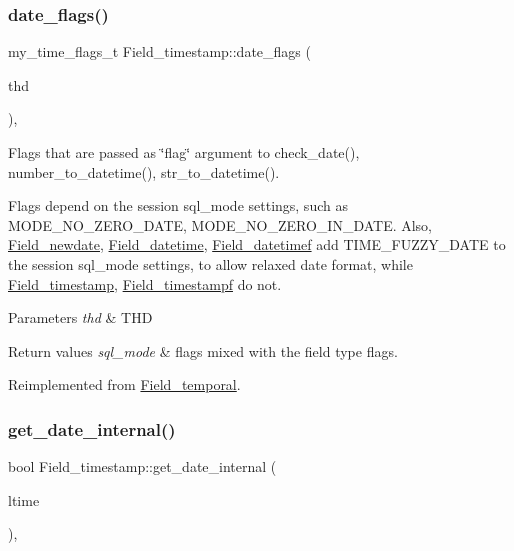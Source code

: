 \subsubsection{\texorpdfstring{date\+\_\+flags()}{date\_flags()}}
{\footnotesize\ttfamily my\+\_\+time\+\_\+flags\+\_\+t Field\+\_\+timestamp\+::date\+\_\+flags (\begin{DoxyParamCaption}\item[{const T\+HD $\ast$}]{thd }\end{DoxyParamCaption})\hspace{0.3cm}{\ttfamily [protected]}, {\ttfamily [virtual]}}

Flags that are passed as \char`\"{}flag\char`\"{} argument to check\+\_\+date(), number\+\_\+to\+\_\+datetime(), str\+\_\+to\+\_\+datetime().

Flags depend on the session sql\+\_\+mode settings, such as M\+O\+D\+E\+\_\+\+N\+O\+\_\+\+Z\+E\+R\+O\+\_\+\+D\+A\+TE, M\+O\+D\+E\+\_\+\+N\+O\+\_\+\+Z\+E\+R\+O\+\_\+\+I\+N\+\_\+\+D\+A\+TE. Also, \mbox{\hyperlink{classField__newdate}{Field\+\_\+newdate}}, \mbox{\hyperlink{classField__datetime}{Field\+\_\+datetime}}, \mbox{\hyperlink{classField__datetimef}{Field\+\_\+datetimef}} add T\+I\+M\+E\+\_\+\+F\+U\+Z\+Z\+Y\+\_\+\+D\+A\+TE to the session sql\+\_\+mode settings, to allow relaxed date format, while \mbox{\hyperlink{classField__timestamp}{Field\+\_\+timestamp}}, \mbox{\hyperlink{classField__timestampf}{Field\+\_\+timestampf}} do not.


\begin{DoxyParams}{Parameters}
{\em thd} & T\+HD \\
\hline
\end{DoxyParams}

\begin{DoxyRetVals}{Return values}
{\em sql\+\_\+mode} & flags mixed with the field type flags. \\
\hline
\end{DoxyRetVals}


Reimplemented from \mbox{\hyperlink{classField__temporal_ac97041d80803a32c6fb9250bfa0c9200}{Field\+\_\+temporal}}.

\mbox{\label{classField__timestamp_aff69ed0b8fb6329aa9dd6dceb14ddd27}} 
\subsubsection{\texorpdfstring{get\+\_\+date\+\_\+internal()}{get\_date\_internal()}}
{\footnotesize\ttfamily bool Field\+\_\+timestamp\+::get\+\_\+date\+\_\+internal (\begin{DoxyParamCaption}\item[{M\+Y\+S\+Q\+L\+\_\+\+T\+I\+ME $\ast$}]{ltime }\end{DoxyParamCaption})\hspace{0.3cm}{\ttfamily [protected]}, {\ttfamily [virtual]}}

